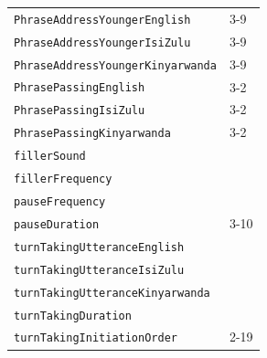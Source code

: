 \documentclass{CSSRforAfrica}
\begin{document}
\begin{table}[H]
\begin{center}
\begin{tabular}{|l l|}
{\footnotesize \verb+PhraseAddressYoungerEnglish+} 	           & {\footnotesize 3-9} \vspace{-1mm}\\
{\footnotesize \verb+PhraseAddressYoungerIsiZulu+} 	           & {\footnotesize 3-9} \vspace{-1mm}\\
{\footnotesize \verb+PhraseAddressYoungerKinyarwanda+} 	           & {\footnotesize 3-9} \vspace{-1mm}\\
{\footnotesize \verb+PhrasePassingEnglish+} 	           & {\footnotesize  3-2 } \vspace{-1mm}\\
{\footnotesize \verb+PhrasePassingIsiZulu+} 	           & {\footnotesize  3-2 } \vspace{-1mm}\\
{\footnotesize \verb+PhrasePassingKinyarwanda+} 	           & {\footnotesize  3-2 } \vspace{-1mm}\\
{\footnotesize \verb+fillerSound+} 	                   & {\footnotesize \verb++} \vspace{-1mm}\\
{\footnotesize \verb+fillerFrequency+} 	                   & {\footnotesize \verb++} \vspace{-1mm}\\
{\footnotesize \verb+pauseFrequency+} 	           & {\footnotesize \verb++} \vspace{-1mm}\\
{\footnotesize \verb+pauseDuration+} 	                    & {\footnotesize 3-10 }\vspace{-1mm} \\
{\footnotesize \verb+turnTakingUtteranceEnglish+} 	            & {\footnotesize \verb++}\vspace{-1mm}\\
{\footnotesize \verb+turnTakingUtteranceIsiZulu+} 	            & {\footnotesize \verb++}\vspace{-1mm}\\
{\footnotesize \verb+turnTakingUtteranceKinyarwanda+} 	            & {\footnotesize \verb++}\vspace{-1mm}\\
{\footnotesize \verb+turnTakingDuration+} 	            & {\footnotesize \verb++}\vspace{-1mm}\\
{\footnotesize \verb+turnTakingInitiationOrder+}            & {\footnotesize 2-19 } \vspace{-1mm}\\

\end{tabular}
\end{center}
\end{table}
\end{document}
